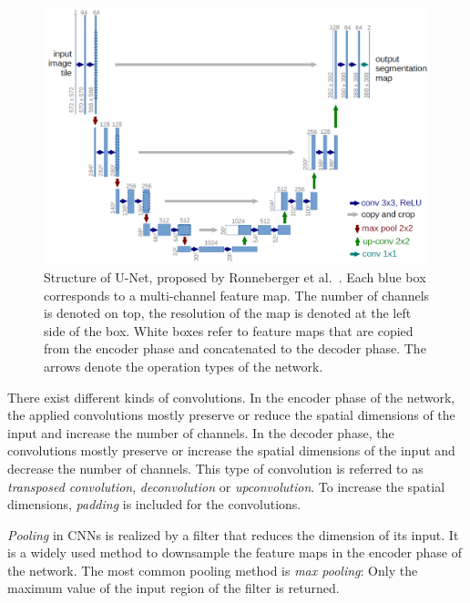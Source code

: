 \begin{figure}
	\centering
	\includegraphics[width=.7\textwidth]{images/networks/u-net-architecture.png}
	\caption[Structure of U-Net]{Structure of U-Net, proposed by Ronneberger et al.~\cite{Ronneberger2015}. Each blue box corresponds to a multi-channel feature map. The number of channels is denoted on top, the resolution of the map is denoted at the left side of the box. White boxes refer to feature maps that are copied from the encoder phase and concatenated to the decoder phase. The arrows denote the operation types of the network.}
	\label{img:basic_u-net}
\end{figure}

There exist different kinds of convolutions. In the encoder phase of the network, the applied convolutions mostly preserve or reduce the spatial dimensions of the input and increase the number of channels. 
In the decoder phase, the convolutions mostly preserve or increase the spatial dimensions of the input and decrease the number of channels. This type of convolution is referred to as \emph{transposed convolution}, \emph{deconvolution} or \emph{upconvolution}. To increase the spatial dimensions, \emph{padding} is included for the convolutions.

\emph{Pooling} in CNNs is realized by a filter that reduces the dimension of its input. It is a widely used method to downsample the feature maps in the encoder phase of the network. The most common pooling method is \emph{max pooling}: Only the maximum value of the input region of the filter is returned.




